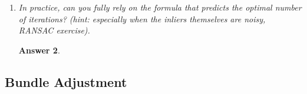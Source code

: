 \documentclass[a4paper,12 pt]{article}
\theoremstyle{definition}
\theoremstyle{remark}
\theoremstyle{definition}
\theoremstyle{definition}
\theoremstyle{definition}
\theoremstyle{definition}
\theoremstyle{remark}
\theoremstyle{remark}
\theoremstyle{definition}
\theoremstyle{definition}
\newtheorem*{answer}{Answer}
\begin{document}
\begin{enumerate}
\begin{answer}
\begin{figure}[h!]
\begin{center}
\caption{Non-holonomic. \label{fig:holonomic}}
\end{center}
\end{figure}
\end{answer}
\item \textit{In practice, can you fully rely on the formula that predicts the optimal number of iterations? (hint: especially when the inliers themselves are noisy, RANSAC exercise).}
\begin{answer}

\end{answer}
\end{enumerate} 

\subsection*{Bundle Adjustment}
\end{document}
